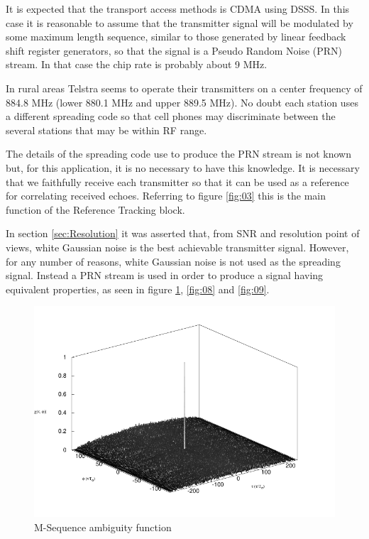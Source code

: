 \documentclass[a4paper]{report}
\numberwithin{equation}{chapter}
\begin{document}
It is expected that the transport access methods is CDMA using DSSS. In this case it is reasonable to assume that the transmitter signal will be modulated by some maximum length sequence, similar to those generated by linear feedback shift register generators, so that the signal is a Pseudo Random Noise (PRN) stream. In that case the chip rate is probably about 9 MHz.

\bigskip

In rural areas Telstra seems to operate their transmitters on a center frequency of 884.8 MHz (lower 880.1 MHz and upper 889.5 MHz). No doubt each station uses a different spreading code so that cell phones may discriminate between the several stations that may be within RF range.

\bigskip

The details of the spreading code use to produce the PRN stream is not known but, for this application, it is no necessary to have this knowledge. It is necessary that we faithfully receive each transmitter so that it can be used as a reference for correlating received echoes. Referring to figure \ref{fig:03} this is the main function of the Reference Tracking block.

\bigskip

In section \ref{sec:Resolution} it was asserted that, from SNR and resolution point of views, white Gaussian noise is the best achievable transmitter signal. However, for any number of reasons, white Gaussian noise is not used as the spreading signal. Instead a PRN stream is used in order to produce a signal having equivalent properties, as seen in figure \ref{fig:13}, \ref{fig:08} and \ref{fig:09}.

\begin{figure}
\centering 
\includegraphics{Passive-Weather-Radar-Theory-fig-13.pdf}
\caption[M-Sequence ambiguity function]{M-Sequence ambiguity function}
\label{fig:13}
\end{figure}
\end{document}

